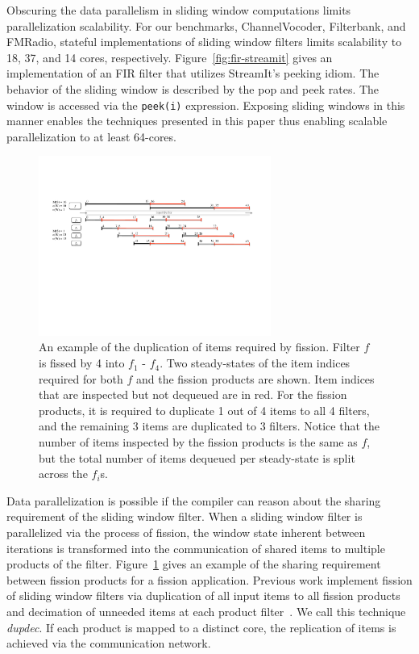 Obscuring the data parallelism in sliding window computations limits
parallelization scalability.  For our benchmarks, ChannelVocoder,
Filterbank, and FMRadio, stateful implementations of sliding window
filters limits scalability to 18, 37, and 14 cores, respectively.
Figure~\ref{fig:fir-streamit} gives an implementation of an FIR filter
that utilizes StreamIt's peeking idiom.  The behavior of the sliding
window is described by the pop and peek rates.  The window is accessed
via the {\tt peek(i)} expression.  Exposing sliding windows in this
manner enables the techniques presented in this paper thus enabling
scalable parallelization to at least 64-cores.


\begin{figure}[t]
\centering
\includegraphics[width=3.0in]{figures/fission-sharing.pdf}
\caption[An example of the sharing required by fission.]  { An
  example of the duplication of items required by fission.  Filter $f$
  is fissed by 4 into $f_1$ - $f_4$.  Two steady-states of the item
  indices required for both $f$ and the fission products are shown.
  Item indices that are inspected but not dequeued are in red.  For the
  fission products, it is required to duplicate 1 out of 4 items to
  all 4 filters, and the remaining 3 items are duplicated to 3
  filters.  Notice that the number of items inspected by the fission
  products is the same as $f$, but the total number of items dequeued 
per steady-state is split across the $f_i$s.
\label{fig:fission-sharing}}
\end{figure}

Data parallelization is possible if the compiler can reason about the
sharing requirement of the sliding window filter.  When a sliding
window filter is parallelized via the process of fission, the window
state inherent between iterations is transformed into the
communication of shared items to multiple products of the filter.
Figure~\ref{fig:fission-sharing} gives an example of the sharing
requirement between fission products for a fission application. 
Previous work implement fission of sliding window filters via
duplication of all input items to all fission products and decimation
of unneeded items at each product filter~\cite{streamit-asplos}.  We
call this technique {\it dupdec}. If each product is mapped to a
distinct core, the replication of items is achieved via the
communication network.


